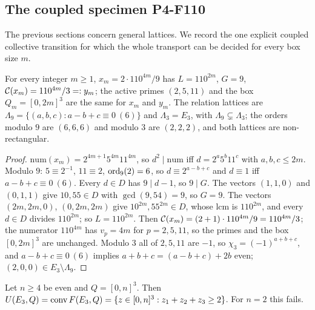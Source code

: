 \subsection{The coupled specimen P4-F110}
The previous sections concern general lattices. We record the one explicit coupled collective transition for which the whole transport can be decided for every box size $m$.
\begin{proposition}[arithmetic of P4-F110]\label{prop:P4A}
For every integer $m\ge1$, $x_m=2\cdot110^{4m}/9$ has $L=110^{2m}$, $G=9$, $\mathcal C(x_m)=110^{4m}/3=:y_m$; the active primes $(2,5,11)$ and the box $Q_m=[0,2m]^3$ are the same for $x_m$ and $y_m$. The relation lattices are $\Lambda_9=\{(a,b,c):a-b+c\equiv0\ (6)\}$ and $\Lambda_3=E_3$, with $\Lambda_9\subsetneq\Lambda_3$; the orders modulo $9$ are $(6,6,6)$ and modulo $3$ are $(2,2,2)$, and both lattices are non-rectangular.
\end{proposition}
\begin{proof}
$\mathrm{num}(x_m)=2^{4m+1}5^{4m}11^{4m}$, so $d^2\mid\mathrm{num}$ iff $d=2^a5^b11^c$ with $a,b,c\le2m$. Modulo $9$: $5\equiv2^{-1}$, $11\equiv2$, $\operatorname{ord}_9(2)=6$, so $d\equiv2^{a-b+c}$ and $d\equiv1$ iff $a-b+c\equiv0\ (6)$. Every $d\in D$ has $9\mid d-1$, so $9\mid G$. The vectors $(1,1,0)$ and $(0,1,1)$ give $10,55\in D$ with $\gcd(9,54)=9$, so $G=9$. The vectors $(2m,2m,0)$, $(0,2m,2m)$ give $10^{2m},55^{2m}\in D$, whose lcm is $110^{2m}$, and every $d\in D$ divides $110^{2m}$; so $L=110^{2m}$. Then $\mathcal C(x_m)=(2+1)\cdot110^{4m}/9=110^{4m}/3$; the numerator $110^{4m}$ has $v_p=4m$ for $p=2,5,11$, so the primes and the box $[0,2m]^3$ are unchanged. Modulo $3$ all of $2,5,11$ are $-1$, so $\chi_3=(-1)^{a+b+c}$, and $a-b+c\equiv0\ (6)$ implies $a+b+c=(a-b+c)+2b$ even; $(2,0,0)\in E_3\setminus\Lambda_9$. \qedhere
\end{proof}
\begin{theorem}\label{thm:hull}
Let $n\ge4$ be even and $Q=[0,n]^3$. Then $U(E_3,Q)=\operatorname{conv} F(E_3,Q)=\{z\in[0,n]^3:z_1+z_2+z_3\ge2\}$. For $n=2$ this fails.
\end{theorem}
